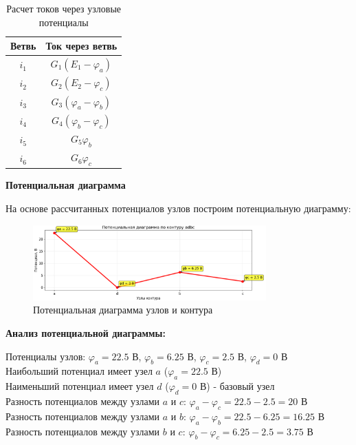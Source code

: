 \begin{table}[H]
\centering
\begin{tabular}{|c|c|}
\hline
\textbf{Ветвь} & \textbf{Ток через ветвь} \\
\hline
$i_1$ & $G_1(E_1 - \varphi_a)$ \\
\hline
$i_2$ & $G_2(E_2 - \varphi_c)$ \\
\hline
$i_3$ & $G_3(\varphi_a - \varphi_b)$ \\
\hline
$i_4$ & $G_4(\varphi_b - \varphi_c)$ \\
\hline
$i_5$ & $G_5\varphi_b$ \\
\hline
$i_6$ & $G_6\varphi_c$ \\
\hline
\end{tabular}
\caption{Расчет токов через узловые потенциалы}
\label{tab:nodal_current_calculations}
\end{table}

\textbf{Потенциальная диаграмма}

На основе рассчитанных потенциалов узлов построим потенциальную диаграмму:

\begin{figure}[H]
\centering
\includegraphics[width=0.8\textwidth]{images/exanple_potential_diagram.png}
\caption{Потенциальная диаграмма узлов и контура}
\label{fig:potential_diagram}
\end{figure}

\textbf{Анализ потенциальной диаграммы:}
\begin{flushleft}
Потенциалы узлов: $\varphi_a = 22.5$ В, $\varphi_b = 6.25$ В, $\varphi_c = 2.5$ В, $\varphi_d = 0$ В \\
Наибольший потенциал имеет узел $a$ ($\varphi_a = 22.5$ В) \\
Наименьший потенциал имеет узел $d$ ($\varphi_d = 0$ В) - базовый узел \\
Разность потенциалов между узлами $a$ и $c$: $\varphi_a - \varphi_c = 22.5 - 2.5 = 20$ В \\
Разность потенциалов между узлами $a$ и $b$: $\varphi_a - \varphi_b = 22.5 - 6.25 = 16.25$ В \\
Разность потенциалов между узлами $b$ и $c$: $\varphi_b - \varphi_c = 6.25 - 2.5 = 3.75$ В
\end{flushleft}


